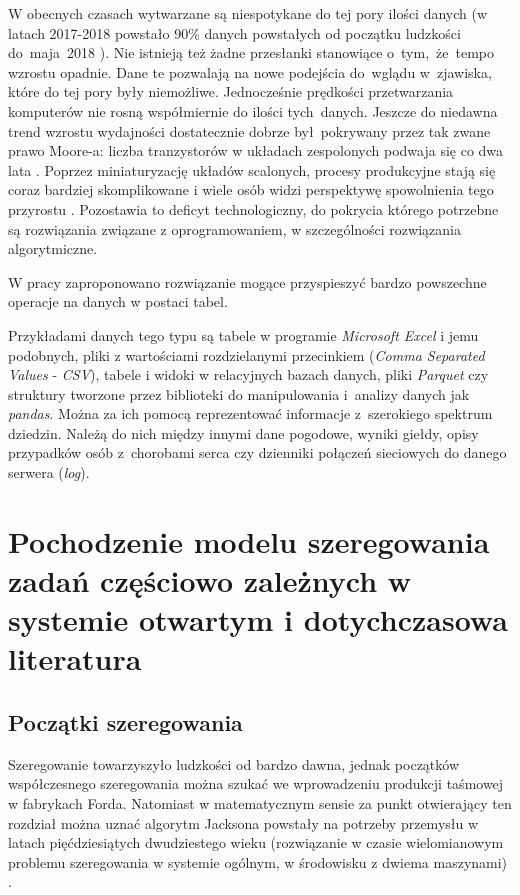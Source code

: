 \documentclass[brudnopis]{xmgr}
\begin{document}
\introduction
W obecnych czasach wytwarzane są niespotykane do tej pory ilości danych (w latach 2017-2018 powstało 90\% danych powstałych od początku ludzkości do~maja~2018 \cite{Forbes:2018:FBS}).
Nie istnieją też żadne przesłanki stanowiące o~tym,~że~tempo wzrostu opadnie.
Dane te pozwalają na nowe podejścia do~wglądu w~zjawiska, które do tej pory były niemożliwe.
Jednocześnie prędkości przetwarzania komputerów nie rosną współmiernie do ilości tych~danych. Jeszcze do niedawna trend wzrostu wydajności dostatecznie dobrze był~pokrywany przez tak zwane prawo Moore-a: liczba tranzystorów w układach zespolonych podwaja się co dwa lata \cite{MOORE:1965:X}. Poprzez miniaturyzację układów scalonych, procesy produkcyjne stają się coraz bardziej skomplikowane i wiele osób widzi perspektywę spowolnienia tego przyrostu \cite{NOTMOORE:2020:X}. Pozostawia to deficyt technologiczny, do pokrycia którego potrzebne są rozwiązania związane z oprogramowaniem, w szczególności rozwiązania algorytmiczne.
\medskip

W pracy zaproponowano rozwiązanie mogące przyspieszyć bardzo powszechne operacje na danych w postaci tabel.
\medskip

Przykładami danych tego typu są tabele w programie \emph{Microsoft Excel} i jemu podobnych, pliki z wartościami rozdzielanymi przecinkiem (\emph{Comma Separated Values} - \emph{CSV}), tabele i widoki w relacyjnych bazach danych, pliki \emph{Parquet} \cite{parquet} czy struktury tworzone przez biblioteki do manipulowania i~analizy danych jak \emph{pandas}.
Można za ich pomocą reprezentować informacje z~szerokiego spektrum dziedzin. Należą do nich między innymi dane pogodowe, wyniki giełdy, opisy przypadków osób z~chorobami serca czy dzienniki połączeń sieciowych do danego serwera (\emph{log}).



\chapter{Pochodzenie modelu szeregowania zadań częściowo zależnych w systemie otwartym i dotychczasowa literatura}


\section{Początki szeregowania}
Szeregowanie towarzyszyło ludzkości od bardzo dawna, jednak początków współczesnego szeregowania można szukać we wprowadzeniu produkcji taśmowej w fabrykach Forda. Natomiast w matematycznym sensie za punkt otwierający ten rozdział można uznać algorytm Jacksona powstały na potrzeby przemysłu w latach pięćdziesiątych dwudziestego wieku (rozwiązanie w czasie wielomianowym problemu szeregowania w systemie ogólnym, w środowisku z dwiema maszynami) \cite{jackson1956extension}.
\medskip
\end{document}
